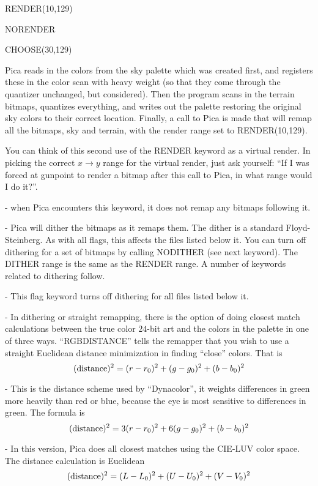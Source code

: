 RENDER(10,129)


NORENDER


CHOOSE(30,129)

\newpar
Pica reads in the colors from the sky palette which was created first, and registers these
in the color scan with heavy weight (so that they come through the quantizer unchanged, but
considered). Then the program scans in the terrain bitmaps, quantizes everything, and writes
out the palette restoring the original sky colors to their correct location. Finally, a call
to Pica is made that will remap all the bitmaps, sky and terrain, with the render range
set to RENDER(10,129).

You can think of this second use of the RENDER keyword as a virtual render. In picking the
correct $x\rightarrow y$ range for the virtual render, just ask yourself: ``If I was forced
at gunpoint to render a bitmap after this call to Pica, in what range would I do it?''. 

 - when Pica encounters this keyword, it does not remap any bitmaps
following it.

 - Pica will dither the bitmaps as it remaps them. The dither is a standard
Floyd-Steinberg. As with all flags, this affects the files listed below it. You can turn off
dithering for a set of bitmaps by calling NODITHER (see next keyword). The DITHER range is
the same as the RENDER range. A number of keywords related to dithering follow.

 - This flag keyword turns off dithering for all files listed below it.

 - In dithering or straight remapping, there is the option of 
doing closest match calculations between the true color $24$-bit art and the colors in the
palette in one of three ways. ``RGBDISTANCE'' tells the remapper that you wish to use a 
straight Euclidean distance minimization in finding ``close'' colors. That is
$$
(\hbox{distance})^2 = (r - r_0)^2 + (g - g_0)^2 + (b - b_0)^2
$$

 - This is the distance scheme used by ``Dynacolor'', it weights
differences in green more heavily than red or blue, because the eye is most sensitive to
differences in green. The formula is
$$
(\hbox{distance})^2 = 3 (r - r_0)^2 + 6 (g - g_0)^2 + (b - b_0)^2
$$

 - In this version, Pica does all closest matches using the CIE-LUV
color space. The distance calculation is Euclidean
$$
(\hbox{distance})^2 = (L - L_0)^2 + (U - U_0)^2 + (V - V_0)^2
$$

